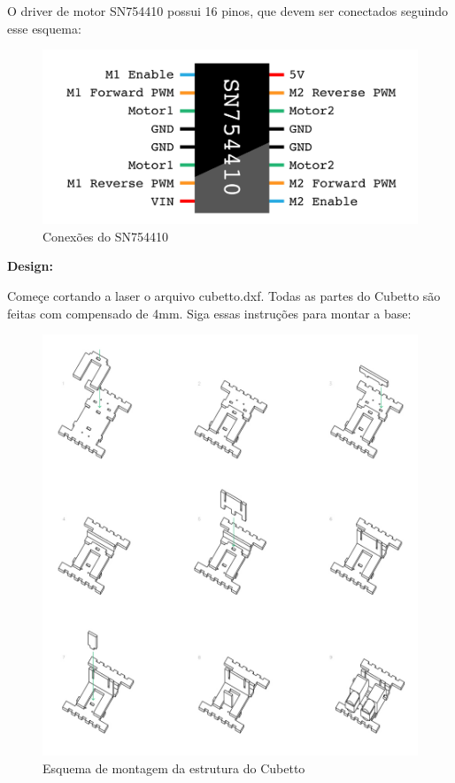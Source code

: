 \documentclass[paper=a4, fontsize=11pt]{scrartcl} %
\numberwithin{equation}{section} %
\numberwithin{figure}{section} %
\numberwithin{table}{section} %
\begin{document}
O driver de motor SN754410 possui 16 pinos, que devem ser conectados seguindo esse esquema:

\begin{figure}[h] %
  \centering
  \includegraphics[scale=0.15]{./imagens/motor-driver.jpg}
  \caption[ ]{Conexões do SN754410 }
  \label{fig:conexao ci}
\end{figure}

\textbf{Design:}

Começe cortando a laser o arquivo cubetto.dxf. Todas as partes do Cubetto são feitas com compensado de 4mm. Siga essas instruções para montar a base:

\begin{figure}[h] %
  \centering
  \includegraphics[scale=0.15]{./imagens/cubetto-guide.jpg}
  \caption[ ]{Esquema de montagem da estrutura do Cubetto }
  \label{fig:montagem cubetto}
\end{figure}
\end{document}
